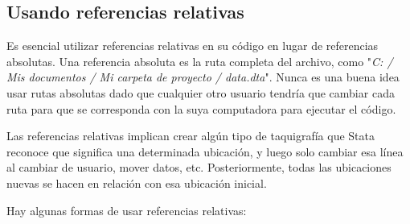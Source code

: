 \documentclass[11pt,en]{elegantpaper}
\begin{document}
\subsection{Usando referencias relativas}
\label{sec:refrelativas}

Es esencial utilizar referencias relativas en su código en lugar de referencias absolutas. Una referencia absoluta es la ruta completa del archivo, como "\textit{C: / Mis documentos / Mi carpeta de proyecto / data.dta}". Nunca es una buena idea usar rutas absolutas dado que cualquier otro usuario tendría que cambiar cada ruta para que se corresponda con la suya computadora para ejecutar el código.

Las referencias relativas implican crear algún tipo de taquigrafía que Stata reconoce que significa una determinada ubicación, y luego solo cambiar esa línea al cambiar de usuario, mover datos, etc. Posteriormente, todas las ubicaciones nuevas se hacen en relación con esa ubicación inicial.

Hay algunas formas de usar referencias relativas:
\end{document}
